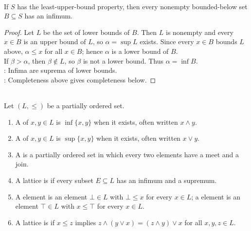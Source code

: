 \begin{theorem} \label{thm:lub-property-gives-glb-property} \\
If $S$ has the least-upper-bound property, then every nonempty bounded-below set $B\subseteq S$ has an infimum.
\begin{proof}
Let $L$ be the set of lower bounds of $B$. Then $L$ is nonempty and every $x\in B$ is an upper bound of $L$, so $\alpha=\sup L$ exists. Since every $x\in B$ bounds $L$ above, $\alpha\leq x$ for all $x\in B$; hence $\alpha$ is a lower bound of $B$.\\
If $\beta>\alpha$, then $\beta\notin L$, so $\beta$ is not a lower bound. Thus $\alpha=\inf B$.\\
: Infima are suprema of lower bounds.\\
: Completeness above gives completeness below.
\end{proof}
\end{theorem}

\begin{definition} \label{def:lattice-vocabulary} \\
Let $(L,\leq)$ be a partially ordered set.
\begin{enumerate}[label=(\roman*)]
\setlength{\itemsep}{0pt}
\item A  of $x,y\in L$ is $\inf\{x,y\}$ when it exists, often written $x\wedge y$.
\item A  of $x,y\in L$ is $\sup\{x,y\}$ when it exists, often written $x\vee y$.
\item A  is a partially ordered set in which every two elements have a meet and a join.
\item A lattice is  if every subset $E\subseteq L$ has an infimum and a supremum.
\item A  element is an element $\bot\in L$ with $\bot\leq x$ for every $x\in L$; a  element is an element $\top\in L$ with $x\leq\top$ for every $x\in L$.
\item A lattice is  if $x\leq z$ implies $z\wedge(y\vee x)=(z\wedge y)\vee x$ for all $x,y,z\in L$.
\end{enumerate}
\end{definition}
